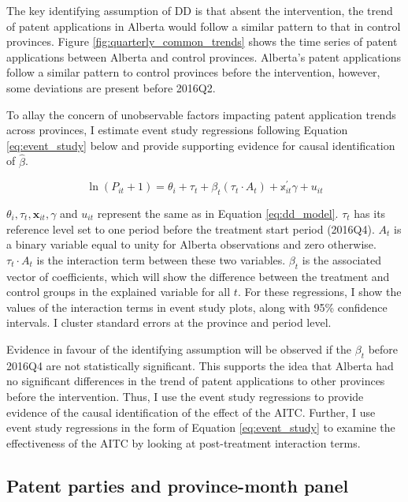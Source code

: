 \documentclass[../main.tex]{subfiles}
\begin{document}
{The key identifying assumption of DD is that absent the intervention, the trend of patent applications in Alberta would follow a similar pattern to that in control provinces. Figure \ref{fig:quarterly_common_trends} shows the time series of patent applications between Alberta and control provinces. Alberta's patent applications follow a similar pattern to control provinces before the intervention, however, some deviations are present before 2016Q2.

To allay the concern of unobservable factors impacting patent application trends across provinces, I estimate event study regressions following Equation \ref{eq:event_study} below and provide supporting evidence for causal identification of $\hat{\beta}$.

\begin{equation}
    \label{eq:event_study}
   \ln(P_{it} + 1) = \theta_i + \tau_t + \beta_t (\tau_t \cdot A_t) + \mathbb{x}_{it}^{'}\gamma + u_{it}
\end{equation}

$\theta_i, \tau_t, \mathbf{x}_{it}, \gamma$ and $u_{it}$ represent the same as in Equation \ref{eq:dd_model}. $\tau_t$ has its reference level set to one period before the treatment start period (2016Q4). $A_t$ is a binary variable equal to unity for Alberta observations and zero otherwise. $\tau_t \cdot A_t$ is the interaction term between these two variables. $\beta_t$ is the associated vector of coefficients, which will show the difference between the treatment and control groups in the explained variable for all $t$. For these regressions, I show the values of the interaction terms in event study plots, along with 95\% confidence intervals. I cluster standard errors at the province and period level.

Evidence in favour of the identifying assumption will be observed if the $\beta_t$ before 2016Q4 are not statistically significant. This supports the idea that Alberta had no significant differences in the trend of patent applications to other provinces before the intervention. Thus, I use the event study regressions to provide evidence of the causal identification of the effect of the AITC. Further, I use event study regressions in the form of Equation \ref{eq:event_study} to examine the effectiveness of the AITC by looking at post-treatment interaction terms.

\subsection{Patent parties and province-month panel}

}
\end{document}
